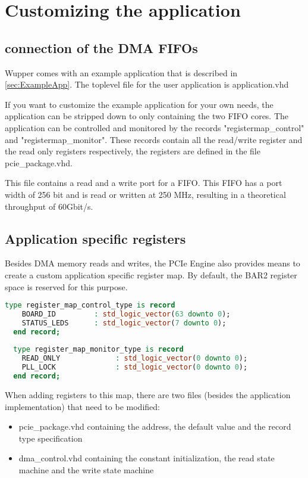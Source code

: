 \section{Customizing the application}
\subsection{connection of the DMA FIFOs}
Wupper comes with an example application that is described in \ref{sec:ExampleApp}. The toplevel file for the user application is application.vhd

If you want to customize the example application for your own needs, the application can be stripped down to only containing the two FIFO cores. The application can be controlled and monitored by the records "registermap\_control" and "registermap\_monitor". These records contain all the read/write register and the read only registers respectively, the registers are defined in the file pcie\_package.vhd.

This file contains a read and a write port for a FIFO. This FIFO has a port width of 256 bit and is read or written at 250 MHz, resulting in a theoretical throughput of 60Gbit/s.

\subsection{Application specific registers}
Besides DMA memory reads and writes, the PCIe Engine also provides means to create a custom application specific register map. By default, the BAR2 register space is reserved for this purpose.

\begin{lstlisting}[language=VHDL, frame=single, caption=custom register types]
  type register_map_control_type is record
    BOARD_ID         : std_logic_vector(63 downto 0);    
    STATUS_LEDS      : std_logic_vector(7 downto 0);
  end record;
  
  type register_map_monitor_type is record
    READ_ONLY             : std_logic_vector(0 downto 0);    
    PLL_LOCK              : std_logic_vector(0 downto 0);    
  end record;
\end{lstlisting}

When adding registers to this map, there are two files (besides the application implementation) that need to be modified:
\begin{itemize}
 \item{pcie\_package.vhd} containing the address, the default value and the record type specification
 \item{dma\_control.vhd} containing the constant initialization, the read state machine and the write state machine
\end{itemize}

